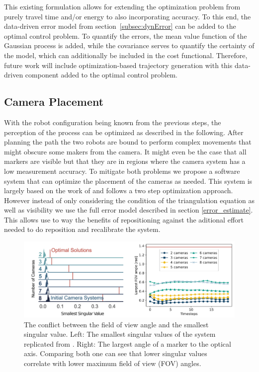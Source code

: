 \documentclass[5p,times,procedia]{elsarticle}
\begin{document}
This existing formulation allows for extending the optimization problem from purely travel time and/or energy to also incorporating accuracy.
To this end, the data-driven error model from section~\ref{subsec:dynError} can be added to the optimal control problem.
To quantify the errors, the mean value function of the Gaussian process is added, while the covariance serves to quantify the certainty of the model, which can additionally be included in the cost functional.
Therefore, future work will include optimization-based trajectory generation with this data-driven component added to the optimal control problem.

\subsection{Camera Placement}
With the robot configuration being known from the previous steps, the perception of the process can be optimized as described in the following.
After planning the path the two robots are bound to perform complex movements that might obscure some makers from the camera.
It might even be the case that all markers are visible but that they are in regions where the camera system has a low measurement accuracy.
To mitigate both problems we propose a software system that can optimize the placement of the cameras as needed.
This system is largely based on the work of \cite{camera_placement} and follows a two step optimization approach.
However instead of only considering the condition of the triangulation equation as well as visibility we use the full error model described in section \ref{error_estimate}.
This allows use to way the benefits of repositioning against the aditional effort needed to do reposition and recalibrate the system.

\begin{figure}[!htb]
	\centering
	\includegraphics[width=\columnwidth]{graphics/fov_sv_conflict.png}
	\caption{The conflict between the field of view angle and the smallest singular value. Left: The smallest singular values of the system replicated from \cite{camera_placement}. Right: The largest angle of a marker to the optical axis.
		Comparing both one can see that lower singular values correlate with lower maximum field of view (FOV) angles.}
	\label{fig:fov_sv_conflict}
\end{figure}
\end{document}
